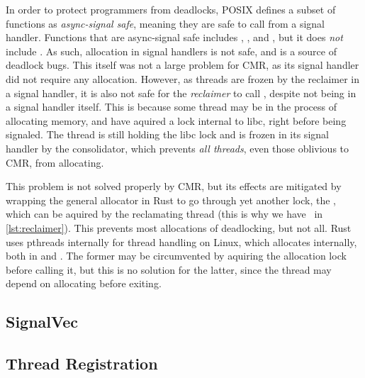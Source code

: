 In order to protect programmers from deadlocks, POSIX defines a subset of functions as
\emph{async-signal safe}, meaning they are safe to call from a signal handler. Functions that are
async-signal safe includes , , and , but it does \emph{not}
include . As such, allocation in signal handlers is not safe, and is a source of
deadlock bugs. This itself was not a large problem for CMR, as its signal handler did not require
any allocation. However, as threads are frozen by the reclaimer in a signal handler, it is also not
safe for the \emph{reclaimer} to call , despite not being in a signal handler itself.
This is because some thread may be in the process of allocating memory, and have aquired a lock
internal to libc, right before being signaled. The thread is still holding the libc lock and is
frozen in its signal handler by the consolidator, which prevents \emph{all threads}, even those
oblivious to CMR, from allocating.

This problem is not solved properly by CMR, but its effects are mitigated by wrapping the general
allocator in Rust to go through yet another lock, the , which can be aquired by
the reclamating thread (this is why we have~ in \cref{lst:reclaimer}). This
prevents most allocations of deadlocking, but not all. Rust uses \gls{pthreads} internally for thread
handling on Linux, which allocates internally, both in  and . The former may
be circumvented by aquiring the allocation lock before calling it, but this is no solution for the
latter, since the thread may depend on allocating before exiting.


\subsection{SignalVec}

\subsection{Thread Registration}









